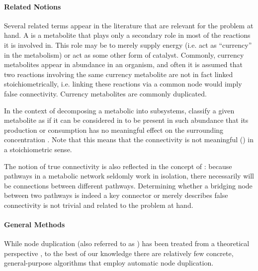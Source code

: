 \documentclass[
	fontsize=10pt, %
	twoside=false, %
	secnumdepth=1, %
  toc=indentunnumbered %
]{kaobook}
\begin{document}
\paragraph{Related Notions} Several related terms appear in the literature that
are relevant for the problem at hand. A 
\cite{huss_CurrencyCommodityMetabolites_2007}
is a metabolite that plays only a secondary
role in most of the reactions it is involved in. This role may be to merely
supply energy (i.e. act as ``currency'' in the metabolism) or act as some other
form of catalyst. Commonly, currency metabolites appear in abundance in an
organism, and often it is assumed that two reactions involving the same currency
metabolite are not in fact linked stoichiometrically, i.e. linking these
reactions via a common node would imply false connectivity.
Currency metabolites are commonly duplicated.

In the context of decomposing a metabolic into subsystems,
\citeauthor{schuster_exploring_2002} classify a given metabolite as
 if it can be considered in to be present in such abundance that
its production or consumption has no meaningful effect on the surrounding
concentration
\cite{schuster_exploring_2002}.
Note that this means that the connectivity is not meaningful
() in a stoichiometric sense. 

The notion of true connectivity is also reflected in the concept of  \cite{kim_IdentificationCriticalConnectors_2019}: because pathways
in a metabolic network seldomly work in isolation, there necessarily will be
connections between different pathways. Determining whether a bridging node
between two pathways is indeed a key connector or merely describes false
connectivity is not trivial and related to the problem at hand.

\paragraph{General Methods} While node duplication (also referred to as
) has been treated from a theoretical perspective
\cite{liebers_PlanarizingGraphsSurvey_2001,abu-khzam_ClusterEditingVertex_2018},
to the best of our knowledge there are relatively few concrete, general-purpose
algorithms that employ automatic node duplication.
\end{document}
